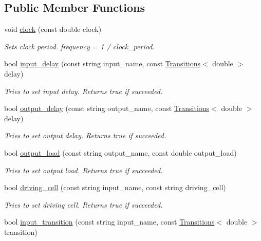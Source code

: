 \subsection*{Public Member Functions}
\begin{DoxyCompactItemize}
\item 
void \hyperlink{classDesign__Constraints_a3d8381f421422cdaa12e78216a3b46a8}{clock} (const double clock)
\begin{DoxyCompactList}\small\item\em Sets clock period. frequency = 1 / clock\-\_\-period. \end{DoxyCompactList}\item 
bool \hyperlink{classDesign__Constraints_ab9e466f0f2ad7cfd16f8fe0d0b814b16}{input\-\_\-delay} (const string input\-\_\-name, const \hyperlink{classTransitions}{Transitions}$<$ double $>$ delay)
\begin{DoxyCompactList}\small\item\em Tries to set input delay. Returns true if succeeded. \end{DoxyCompactList}\item 
bool \hyperlink{classDesign__Constraints_a295b66d558e3aefea0b2d2629752517d}{output\-\_\-delay} (const string output\-\_\-name, const \hyperlink{classTransitions}{Transitions}$<$ double $>$ delay)
\begin{DoxyCompactList}\small\item\em Tries to set output delay. Returns true if succeeded. \end{DoxyCompactList}\item 
bool \hyperlink{classDesign__Constraints_a3a670a53112e18db745a6f3de9597cd3}{output\-\_\-load} (const string output\-\_\-name, const double output\-\_\-load)
\begin{DoxyCompactList}\small\item\em Tries to set output load. Returns true if succeeded. \end{DoxyCompactList}\item 
bool \hyperlink{classDesign__Constraints_a54c18f5ebd9dbcdc9d3ab8f2d363fc04}{driving\-\_\-cell} (const string input\-\_\-name, const string driving\-\_\-cell)
\begin{DoxyCompactList}\small\item\em Tries to set driving cell. Returns true if succeeded. \end{DoxyCompactList}\item 
bool \hyperlink{classDesign__Constraints_afd86c8844a5a62d1a6bbd7138d548cf9}{input\-\_\-transition} (const string input\-\_\-name, const \hyperlink{classTransitions}{Transitions}$<$ double $>$ transition)

\end{DoxyCompactItemize}
